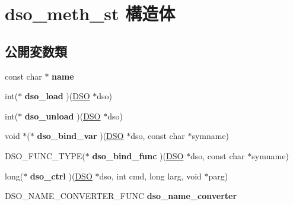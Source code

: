 \hypertarget{structdso__meth__st}{}\section{dso\+\_\+meth\+\_\+st 構造体}
\label{structdso__meth__st}
\subsection*{公開変数類}
\begin{DoxyCompactItemize}
\item 
\hypertarget{structdso__meth__st_aef9c2213572b32054a97a99954505d6e}{}const char $\ast$ {\bfseries name}\label{structdso__meth__st_aef9c2213572b32054a97a99954505d6e}

\item 
\hypertarget{structdso__meth__st_ad0931e27df22d21228272993683488b8}{}int($\ast$ {\bfseries dso\+\_\+load} )(\hyperlink{structdso__st}{D\+S\+O} $\ast$dso)\label{structdso__meth__st_ad0931e27df22d21228272993683488b8}

\item 
\hypertarget{structdso__meth__st_a330000d54dcc81e708bc60ef31ca9daf}{}int($\ast$ {\bfseries dso\+\_\+unload} )(\hyperlink{structdso__st}{D\+S\+O} $\ast$dso)\label{structdso__meth__st_a330000d54dcc81e708bc60ef31ca9daf}

\item 
\hypertarget{structdso__meth__st_a64e053582cae745cef5ff6643b8258cb}{}void $\ast$($\ast$ {\bfseries dso\+\_\+bind\+\_\+var} )(\hyperlink{structdso__st}{D\+S\+O} $\ast$dso, const char $\ast$symname)\label{structdso__meth__st_a64e053582cae745cef5ff6643b8258cb}

\item 
\hypertarget{structdso__meth__st_a6a179a5a759e8d6837055f217848e3db}{}D\+S\+O\+\_\+\+F\+U\+N\+C\+\_\+\+T\+Y\+P\+E($\ast$ {\bfseries dso\+\_\+bind\+\_\+func} )(\hyperlink{structdso__st}{D\+S\+O} $\ast$dso, const char $\ast$symname)\label{structdso__meth__st_a6a179a5a759e8d6837055f217848e3db}

\item 
\hypertarget{structdso__meth__st_abc9ee5fe4894fa7bd80d37e1d20393ec}{}long($\ast$ {\bfseries dso\+\_\+ctrl} )(\hyperlink{structdso__st}{D\+S\+O} $\ast$dso, int cmd, long larg, void $\ast$parg)\label{structdso__meth__st_abc9ee5fe4894fa7bd80d37e1d20393ec}

\item 
\hypertarget{structdso__meth__st_a02abdcfb6f66b31d697d4bdc4ec647ba}{}D\+S\+O\+\_\+\+N\+A\+M\+E\+\_\+\+C\+O\+N\+V\+E\+R\+T\+E\+R\+\_\+\+F\+U\+N\+C {\bfseries dso\+\_\+name\+\_\+converter}\label{structdso__meth__st_a02abdcfb6f66b31d697d4bdc4ec647ba}


\end{DoxyCompactItemize}
